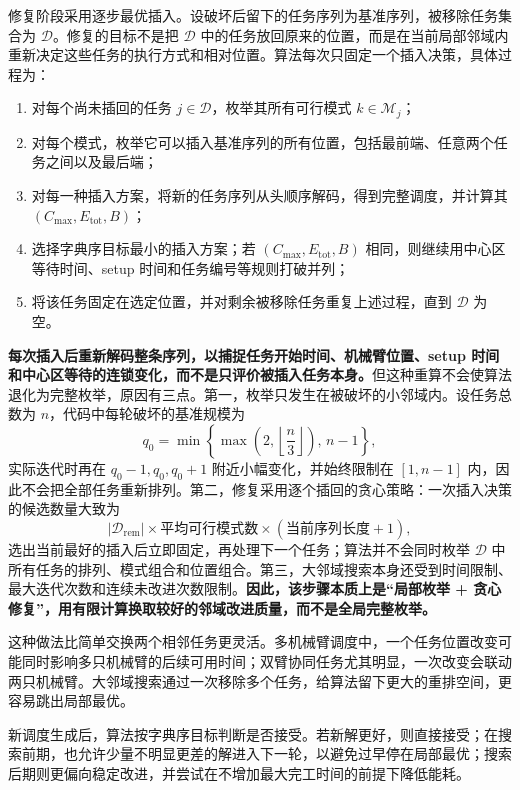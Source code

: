 修复阶段采用逐步最优插入。设破坏后留下的任务序列为基准序列，被移除任务集合为 $\mathcal{D}$。修复的目标不是把 $\mathcal{D}$ 中的任务放回原来的位置，而是在当前局部邻域内重新决定这些任务的执行方式和相对位置。算法每次只固定一个插入决策，具体过程为：
\begin{enumerate}
    \item 对每个尚未插回的任务 $j\in\mathcal{D}$，枚举其所有可行模式 $k\in\mathcal{M}_j$；
    \item 对每个模式，枚举它可以插入基准序列的所有位置，包括最前端、任意两个任务之间以及最后端；
    \item 对每一种插入方案，将新的任务序列从头顺序解码，得到完整调度，并计算其 $(C_{\max},E_{\mathrm{tot}},B)$；
    \item 选择字典序目标最小的插入方案；若 $(C_{\max},E_{\mathrm{tot}},B)$ 相同，则继续用中心区等待时间、setup 时间和任务编号等规则打破并列；
    \item 将该任务固定在选定位置，并对剩余被移除任务重复上述过程，直到 $\mathcal{D}$ 为空。
\end{enumerate}

\textbf{每次插入后重新解码整条序列，以捕捉任务开始时间、机械臂位置、setup 时间和中心区等待的连锁变化，而不是只评价被插入任务本身。}但这种重算不会使算法退化为完整枚举，原因有三点。第一，枚举只发生在被破坏的小邻域内。设任务总数为 $n$，代码中每轮破坏的基准规模为
\[
    q_0=\min\left\{\max\left(2,\left\lfloor\frac{n}{3}\right\rfloor\right),\,n-1\right\},
\]
实际迭代时再在 $q_0-1,q_0,q_0+1$ 附近小幅变化，并始终限制在 $[1,n-1]$ 内，因此不会把全部任务重新排列。第二，修复采用逐个插回的贪心策略：一次插入决策的候选数量大致为
\[
    |\mathcal{D}_{\mathrm{rem}}|
    \times
    \text{平均可行模式数}
    \times
    (\text{当前序列长度}+1),
\]
选出当前最好的插入后立即固定，再处理下一个任务；算法并不会同时枚举 $\mathcal{D}$ 中所有任务的排列、模式组合和位置组合。第三，大邻域搜索本身还受到时间限制、最大迭代次数和连续未改进次数限制。\textbf{因此，该步骤本质上是“局部枚举 + 贪心修复”，用有限计算换取较好的邻域改进质量，而不是全局完整枚举。}

这种做法比简单交换两个相邻任务更灵活。多机械臂调度中，一个任务位置改变可能同时影响多只机械臂的后续可用时间；双臂协同任务尤其明显，一次改变会联动两只机械臂。大邻域搜索通过一次移除多个任务，给算法留下更大的重排空间，更容易跳出局部最优。

新调度生成后，算法按字典序目标判断是否接受。若新解更好，则直接接受；在搜索前期，也允许少量不明显更差的解进入下一轮，以避免过早停在局部最优；搜索后期则更偏向稳定改进，并尝试在不增加最大完工时间的前提下降低能耗。

